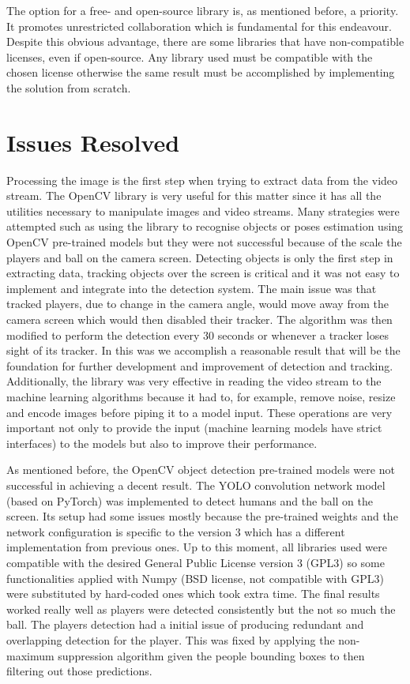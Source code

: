 \documentclass[
    11pt,
    oneside
]{report}
\begin{document}
The option for a free- and open-source library is, as mentioned before, a priority. It promotes unrestricted collaboration which is fundamental for this endeavour. Despite this obvious advantage, there are some libraries that have non-compatible licenses, even if open-source. Any library used must be compatible with the chosen license otherwise the same result must be accomplished by implementing the solution from scratch.



\section{Issues Resolved}


Processing the image is the first step when trying to extract data from the video stream. The OpenCV library \cite{opencv} is very useful for this matter since it has all the utilities necessary to manipulate images and video streams. Many strategies were attempted such as using the library to recognise objects or poses estimation using OpenCV \cite{opencv} pre-trained models but they were not successful because of the scale the players and ball on the camera screen. Detecting objects is only the first step in extracting data, tracking objects over the screen is critical and it was not easy to implement and integrate into the detection system. The main issue was that tracked players, due to change in the camera angle, would move away from the camera screen which would then disabled their tracker. The algorithm was then modified to perform the detection every 30 seconds or whenever a tracker loses sight of its tracker. In this was we accomplish a reasonable result that will be the foundation for further development and improvement of detection and tracking. Additionally, the library was very effective in reading the video stream to the machine learning algorithms because it had to, for example, remove noise, resize and encode images before piping it to a model input. These operations are very important not only to provide the input (machine learning models have strict interfaces) to the models but also to improve their performance.


As mentioned before, the OpenCV \cite{opencv} object detection pre-trained models were not successful in achieving a decent result. The YOLO \cite{yolo} convolution network model (based on PyTorch) was implemented to detect humans and the ball on the screen. Its setup had some issues mostly because the pre-trained weights and the network configuration is specific to the version 3 which has a different implementation from previous ones. Up to this moment, all libraries used were compatible with the desired General Public License version 3 (GPL3) so some functionalities applied with Numpy \cite{numpy} (BSD license, not compatible with GPL3) were substituted by hard-coded ones which took extra time. The final results worked really well as players were detected consistently but the not so much the ball. The players detection had a initial issue of producing redundant and overlapping detection for the player. This was fixed by applying the non-maximum suppression algorithm given the people bounding boxes to then filtering out those predictions.
\end{document}
